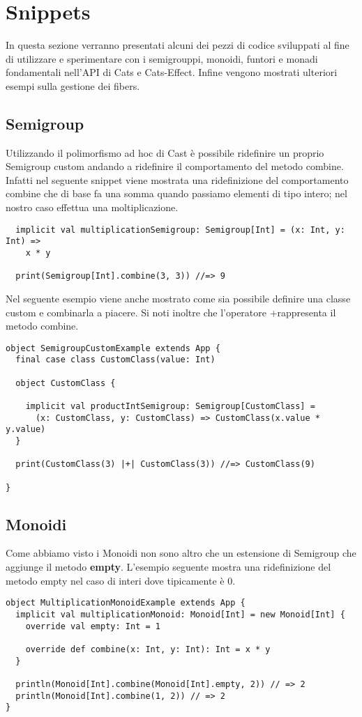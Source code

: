 \chapter{Snippets}
In questa sezione verranno presentati alcuni dei pezzi di codice sviluppati al fine di utilizzare e sperimentare con i semigrouppi, monoidi, funtori e monadi fondamentali nell’API di Cats e Cats-Effect. Infine vengono mostrati ulteriori esempi sulla gestione dei fibers.

\section{Semigroup}
Utilizzando il polimorfismo ad hoc di Cast è possibile ridefinire un proprio Semigroup custom andando a ridefinire il comportamento del metodo combine. Infatti nel seguente snippet viene  mostrata una ridefinizione del comportamento combine che di base fa una somma quando passiamo elementi di tipo intero; nel nostro caso effettua una moltiplicazione.
\begin{verbatim}
  implicit val multiplicationSemigroup: Semigroup[Int] = (x: Int, y: Int) =>
    x * y

  print(Semigroup[Int].combine(3, 3)) //=> 9
\end{verbatim}

\noindent Nel seguente esempio viene anche mostrato come sia possibile definire una classe custom e combinarla a piacere. Si noti inoltre che l'operatore \textbar +\textbar rappresenta il metodo combine.
\begin{verbatim}
object SemigroupCustomExample extends App {
  final case class CustomClass(value: Int)

  object CustomClass {

    implicit val productIntSemigroup: Semigroup[CustomClass] =
      (x: CustomClass, y: CustomClass) => CustomClass(x.value * y.value)
  }
  
  print(CustomClass(3) |+| CustomClass(3)) //=> CustomClass(9)

}
\end{verbatim}

\section{Monoidi}
Come abbiamo visto i Monoidi non sono altro che un estensione di Semigroup che aggiunge il metodo \textbf{empty}. L'esempio seguente mostra una ridefinizione del metodo empty nel caso di interi dove tipicamente è 0. 
\begin{verbatim}
object MultiplicationMonoidExample extends App {
  implicit val multiplicationMonoid: Monoid[Int] = new Monoid[Int] {
    override val empty: Int = 1

    override def combine(x: Int, y: Int): Int = x * y
  }

  println(Monoid[Int].combine(Monoid[Int].empty, 2)) // => 2
  println(Monoid[Int].combine(1, 2)) // => 2
}
\end{verbatim}

